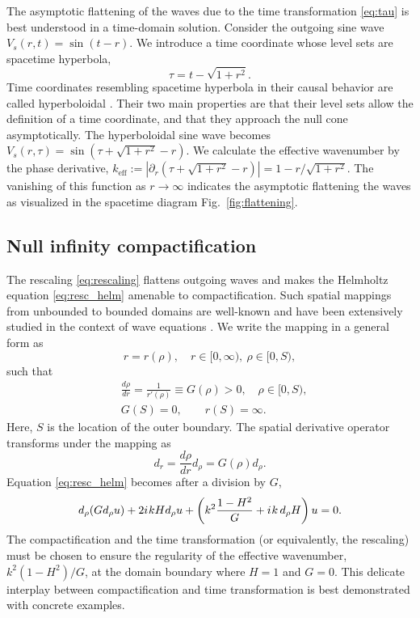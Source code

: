 \documentclass[onefignum,onetabnum]{siamart190516}
\newcommand{\be}{\begin{equation}}
\newcommand{\ee}{\end{equation}}
\newcommand{\iu}{{i\mkern1mu}}
\begin{document}
The asymptotic flattening of the waves due to the time transformation \eqref{eq:tau} is best understood in a time-domain solution. Consider the outgoing sine wave $V_s(r,t) = \sin(t-r)$. We introduce a time coordinate whose level sets are spacetime hyperbola,
\be\label{eq:hyperbola} \tau = t - \sqrt{1+r^2}.\ee
Time coordinates resembling spacetime hyperbola in their causal behavior are called hyperboloidal \cite{friedrich1986, zenginouglu2024hyperbolic}. Their two main properties are that their level sets allow the definition of a time coordinate, and that they approach the null cone asymptotically. The hyperboloidal sine wave becomes $V_s(r,\tau) = \sin\left(\tau + \sqrt{1+r^2} - r\right)$. We calculate the effective wavenumber by the phase derivative, $k_\mathrm{eff} :=| \partial_r \left(\tau + \sqrt{1+r^2} - r\right) | = 1-r/\sqrt{1+r^2}$. The vanishing of this function as $r\to\infty$ indicates the asymptotic flattening the waves as visualized in the spacetime diagram Fig.~\ref{fig:flattening}.

\subsection{Null infinity compactification}\label{sec:nic}
The rescaling \eqref{eq:rescaling} flattens outgoing waves and makes the Helmholtz equation \eqref{eq:resc_helm} amenable to compactification. Such spatial mappings from unbounded to bounded domains are well-known and have been extensively studied in the context of wave equations \cite{GroschOrszag77, boyd1982optimization, shen2009some, wang2017perfect}. We write the mapping in a general form as
\be\label{eq:mapping} r = r(\rho), \quad r\in[0,\infty),\ \rho\in[0,S), \ee
such that
\begin{align}\label{eqn:G}
	 & \frac{d\rho}{dr} = \frac{1}{r'(\rho)} \equiv G(\rho) > 0, \quad \rho\in [0,S), \\
	 & G(S)      = 0, \qquad r(S) = \infty.\nonumber
\end{align}
Here, $S$ is the location of the outer boundary. The spatial derivative operator transforms under the mapping as
\[ d_r = \frac{d\rho}{dr} d_\rho = G(\rho) d_\rho.  \]
Equation \eqref{eq:resc_helm} becomes after a division by $G$,
\be\label{eq:trafo_helm}
d_\rho (G d_\rho u) + 2 \iu k H d_\rho u + \left(k^2 \frac{1-H^2}{G} + \iu k \, d_\rho H \right) u = 0.
\ee
The compactification and the time transformation (or equivalently, the rescaling) must be chosen to ensure the regularity of the effective wavenumber, $k^2 (1-H^2)/G$, at the domain boundary where $H=1$ and $G=0$. This delicate interplay between compactification and time transformation is best demonstrated with concrete examples.
\end{document}
